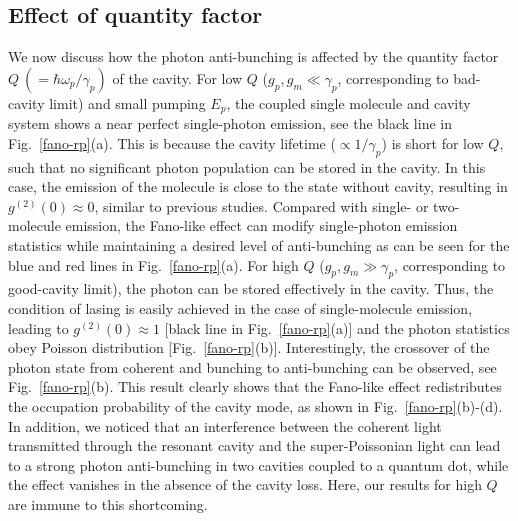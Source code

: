 \documentclass[aps,preprint,floatfix,footinbib,longbibliography]{revtex4-1}
\begin{document}


\subsection{Effect of quantity factor}
We now discuss how the photon anti-bunching is affected by the quantity factor $Q~(=\hbar\omega_{p}/\gamma_{p})$ of the cavity.
For low $Q$ ($g_{p},g_{m}\ll \gamma_{p}$, corresponding to bad-cavity limit) and small pumping $E_{p}$, the coupled single molecule and cavity system shows a near perfect single-photon emission, see the black line in Fig.~\ref{fano-rp}(a).
This is because the cavity lifetime ($\propto 1/\gamma_{p}$) is short for low $Q$, such that no significant photon population can be stored in the cavity.
In this case, the emission of the molecule is close to the state without cavity, resulting in $g^{(2)}(0)\approx0$, similar to previous studies\cite{PhysRevB.70.115304,PhysRevA.91.061804}.
Compared with single- or two-molecule emission, the Fano-like effect can modify single-photon emission statistics while maintaining
a desired level of anti-bunching as can be seen for the blue and red lines in Fig.~\ref{fano-rp}(a).
For high $Q$ ($g_{p},g_{m}\gg \gamma_{p}$, corresponding to good-cavity limit), the photon can be stored effectively in the cavity. Thus, the condition of lasing is easily achieved in the case of single-molecule emission, leading to $g^{(2)}(0)\approx 1$ [black line in Fig.~\ref{fano-rp}(a)] and the photon statistics obey Poisson distribution [Fig.~\ref{fano-rp}(b)].
Interestingly, the crossover of the photon state from coherent and bunching to anti-bunching can be observed, see Fig.~\ref{fano-rp}(b).
This result clearly shows that the Fano-like effect redistributes the occupation probability of the cavity mode, as shown in Fig.~\ref{fano-rp}(b)-(d).
 In addition, we noticed that an interference between the coherent light transmitted through the resonant cavity and the super-Poissonian light can lead to a strong photon anti-bunching in two cavities coupled to a quantum dot, while the effect vanishes in the absence of the cavity loss\cite{PhysRevLett.108.183601}. Here, our results for high $Q$ are immune to this shortcoming.
\end{document}
